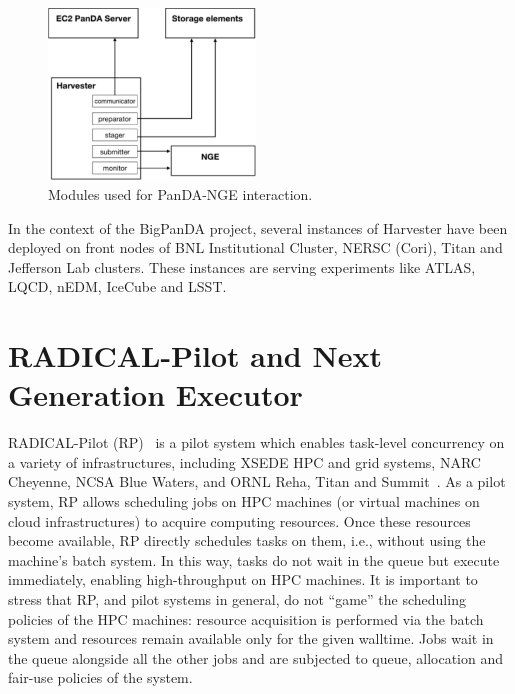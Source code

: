 \documentclass{webofc}
\begin{document}
\begin{figure}
	\centering
	\includegraphics[width=0.49\textwidth]{figures/panda-harvester-modules.pdf}
	\caption{Modules used for PanDA-NGE interaction.}
	\label{fig:harvester-modules}
\end{figure}

In the context of the BigPanDA project, several instances of Harvester have been
deployed on front nodes of BNL Institutional Cluster, NERSC (Cori), Titan and
Jefferson Lab clusters. These instances are serving experiments like ATLAS,
LQCD, nEDM, IceCube and LSST.


\section{RADICAL-Pilot and Next Generation Executor}\label{sec:rp}

RADICAL-Pilot (RP)~\cite{Merzky2018DesignAP} is a pilot system which enables task-level concurrency on
a variety of infrastructures, including XSEDE HPC and grid systems, NARC
Cheyenne, NCSA Blue Waters, and ORNL Reha, Titan and
Summit~\cite{merzky2018using}. As a pilot system, RP allows scheduling jobs
on HPC machines (or virtual machines on cloud infrastructures) to acquire
computing resources. Once these resources become available, RP directly
schedules tasks on them, i.e., without using the machine’s batch system. In
this way, tasks do not wait in the queue but execute immediately, enabling
high-throughput on HPC machines. It is important to stress that RP, and pilot
systems in general, do not ``game'' the scheduling policies of the HPC
machines: resource acquisition is performed via the batch system and
resources remain available only for the given walltime. Jobs wait in the
queue alongside all the other jobs and are subjected to queue, allocation and
fair-use policies of the system.
	
\end{document}
